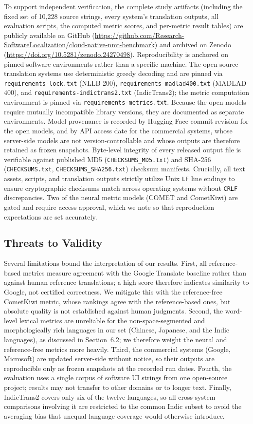 \documentclass[pdflatex,sn-mathphys-num]{sn-jnl}
\begin{document}
To support independent verification, the complete study artifacts (including the fixed set of 10,228 source strings, every system's translation outputs, all evaluation scripts, the computed metric scores, and per-metric result tables) are publicly available on GitHub (\url{https://github.com/Research-SoftwareLocalization/cloud-native-nmt-benchmark}) and archived on Zenodo (\url{https://doi.org/10.5281/zenodo.24270498}). Reproducibility is anchored on pinned software environments rather than a specific machine. The open-source translation systems use deterministic greedy decoding and are pinned via \texttt{requirements-lock.txt} (NLLB-200), \texttt{requirements-madlad400.txt} (MADLAD-400), and \texttt{requirements-indictrans2.txt} (IndicTrans2); the metric computation environment is pinned via \texttt{requirements-metrics.txt}. Because the open models require mutually incompatible library versions, they are documented as separate environments. Model provenance is recorded by Hugging Face commit revision for the open models, and by API access date for the commercial systems, whose server-side models are not version-controllable and whose outputs are therefore retained as frozen snapshots. Byte-level integrity of every released output file is verifiable against published MD5 (\texttt{CHECKSUMS\_MD5.txt}) and SHA-256 (\texttt{CHECKSUMS.txt}, \texttt{CHECKSUMS\_SHA256.txt}) checksum manifests. Crucially, all text assets, scripts, and translation outputs strictly utilize Unix \texttt{LF} line endings to ensure cryptographic checksums match across operating systems without \texttt{CRLF} discrepancies. Two of the neural metric models (COMET and CometKiwi) are gated and require access approval, which we note so that reproduction expectations are set accurately.

\subsection{Threats to Validity}

Several limitations bound the interpretation of our results. First, all reference-based metrics measure agreement with the Google Translate baseline rather than against human reference translations; a high score therefore indicates similarity to Google, not certified correctness. We mitigate this with the reference-free CometKiwi metric, whose rankings agree with the reference-based ones, but absolute quality is not established against human judgments. Second, the word-level lexical metrics are unreliable for the non-space-segmented and morphologically rich languages in our set (Chinese, Japanese, and the Indic languages), as discussed in Section~6.2; we therefore weight the neural and reference-free metrics more heavily. Third, the commercial systems (Google, Microsoft) are updated server-side without notice, so their outputs are reproducible only as frozen snapshots at the recorded run dates. Fourth, the evaluation uses a single corpus of software UI strings from one open-source project; results may not transfer to other domains or to longer text. Finally, IndicTrans2 covers only six of the twelve languages, so all cross-system comparisons involving it are restricted to the common Indic subset to avoid the averaging bias that unequal language coverage would otherwise introduce.
\end{document}

